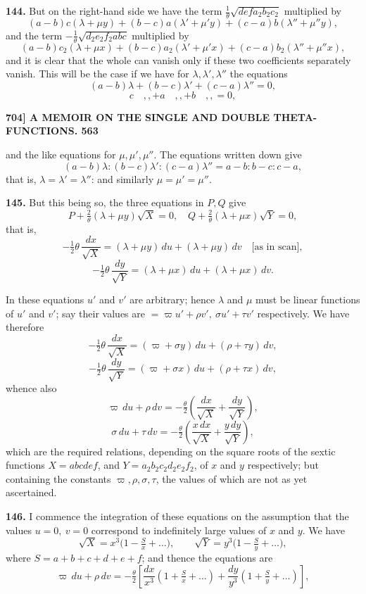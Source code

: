 \documentclass[11pt]{article}
\begin{document}
\medskip
\textbf{144.} But on the right-hand side we have the term $\tfrac{1}{\theta}\sqrt{defa_2b_2c_2}$ multiplied by
\[
(a - b)c(\lambda + \mu y) + (b - c)a(\lambda' + \mu' y) + (c - a)b(\lambda'' + \mu'' y),
\]
and the term $-\tfrac{1}{\theta}\sqrt{d_2e_2f_2abc}$ multiplied by
\[
(a - b)c_2(\lambda + \mu x) + (b - c)a_2(\lambda' + \mu' x) + (c - a)b_2(\lambda'' + \mu'' x),
\]
and it is clear that the whole can vanish only if these two coefficients separately vanish. This will be the case if we have for $\lambda, \lambda', \lambda''$ the equations
\[
(a - b)\lambda + (b - c)\lambda' + (c - a)\lambda'' = 0,
\]
\[
c\quad,, + a\quad,, + b\quad,, = 0,
\]

\newpage
\noindent\textbf{704] \quad A MEMOIR ON THE SINGLE AND DOUBLE THETA-FUNCTIONS. \hfill 563}

\medskip
and the like equations for $\mu, \mu', \mu''$. The equations written down give
\[
(a - b)\lambda : (b - c)\lambda' : (c - a)\lambda'' = a - b : b - c : c - a,
\]
that is, $\lambda = \lambda' = \lambda''$: and similarly $\mu = \mu' = \mu''$.

\medskip
\textbf{145.} But this being so, the three equations in $P, Q$ give
\[
P + \tfrac{2}{\theta}(\lambda + \mu y)\sqrt{X} = 0,\quad Q + \tfrac{2}{\theta}(\lambda + \mu x)\sqrt{Y} = 0,
\]
that is,
\[
-\tfrac{1}{2}\theta\,\frac{dx}{\sqrt{X}} = (\lambda + \mu y)\,du + (\lambda + \mu y)\,dv\quad\text{[as in scan]},
\]
\[
-\tfrac{1}{2}\theta\,\frac{dy}{\sqrt{Y}} = (\lambda + \mu x)\,du + (\lambda + \mu x)\,dv.
\]

In these equations $u'$ and $v'$ are arbitrary; hence $\lambda$ and $\mu$ must be linear functions of $u'$ and $v'$; say their values are $= \varpi u' + \rho v',\ \sigma u' + \tau v'$ respectively. We have therefore
\[
-\tfrac{1}{2}\theta\,\frac{dx}{\sqrt{X}} = (\varpi + \sigma y)\,du + (\rho + \tau y)\,dv,
\]
\[
-\tfrac{1}{2}\theta\,\frac{dy}{\sqrt{Y}} = (\varpi + \sigma x)\,du + (\rho + \tau x)\,dv,
\]
whence also
\[
\varpi\,du + \rho\,dv = -\tfrac{\theta}{2}\!\left(\frac{dx}{\sqrt{X}} + \frac{dy}{\sqrt{Y}}\right),
\]
\[
\sigma\,du + \tau\,dv = -\tfrac{\theta}{2}\!\left(\frac{x\,dx}{\sqrt{X}} + \frac{y\,dy}{\sqrt{Y}}\right),
\]
which are the required relations, depending on the square roots of the sextic functions $X = abcdef$, and $Y = a_2b_2c_2d_2e_2f_2$, of $x$ and $y$ respectively; but containing the constants $\varpi, \rho, \sigma, \tau$, the values of which are not as yet ascertained.

\medskip
\textbf{146.} I commence the integration of these equations on the assumption that the values $u = 0,\ v = 0$ correspond to indefinitely large values of $x$ and $y$. We have
\[
\sqrt{X} = x^3\bigl(1 - \tfrac{S}{x} + \ldots\bigr),\qquad \sqrt{Y} = y^3\bigl(1 - \tfrac{S}{y} + \ldots\bigr),
\]
where $S = a + b + c + d + e + f$; and thence the equations are
\[
\varpi\,du + \rho\,dv = -\tfrac{\theta}{2}\!\left[\frac{dx}{x^3}\!\left(1 + \tfrac{S}{x} + \ldots\right) + \frac{dy}{y^3}\!\left(1 + \tfrac{S}{y} + \ldots\right)\right],
\]
\end{document}
